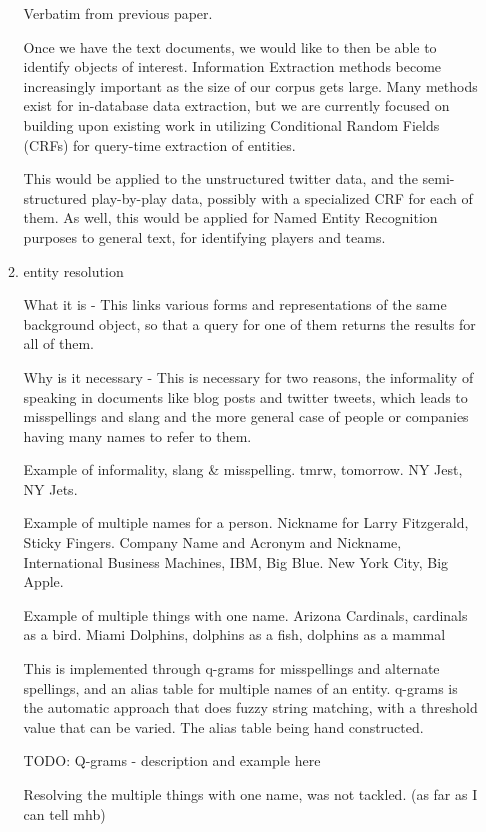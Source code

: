 \documentclass{article}
\begin{document}
\begin{enumerate}
\begin{enumerate}
    Verbatim from previous paper.

    Once we have the text documents, we would like to then be able to identify
    objects of interest. Information Extraction methods become increasingly
    important as the size of our corpus gets large. Many methods exist for in-database data
    extraction, but we are currently focused on building upon existing work in
    utilizing Conditional Random Fields (CRFs) for query-time extraction of
    entities.

    This would be applied to the unstructured twitter data,
    and the semi-structured play-by-play data,
    possibly with a specialized CRF for each of them.
    As well, this would be applied for Named Entity Recognition purposes to general text, for identifying players and teams.

  \item entity resolution

    What it is -
    This links various forms and representations of the same background object,
    so that a query for one of them returns the results for all of them.

    Why is it necessary -
    This is necessary for two reasons,
    the informality of speaking in documents like blog posts and twitter tweets,
    which leads to misspellings and slang
    and the more  general case of people or companies having many names to refer to them.

    Example of informality, slang \& misspelling. tmrw, tomorrow. NY Jest, NY Jets.

    Example of multiple names for a person.
    Nickname for Larry Fitzgerald, Sticky Fingers.
    Company Name and Acronym and Nickname, International Business Machines, IBM, Big Blue.
    New York City, Big Apple.

    Example of multiple things with one name.
    Arizona Cardinals, cardinals as a bird.
    Miami Dolphins, dolphins as a fish, dolphins as a mammal


    This is implemented through q-grams for misspellings and alternate spellings,
    and an alias table for multiple names of an entity.
    q-grams is the automatic approach that does fuzzy string matching,
    with a threshold value that can be varied.
    The alias table being hand constructed.

    TODO: Q-grams - description and example here

    Resolving the multiple things with one name, was not tackled. (as far as I can tell mhb)


\end{enumerate}
\end{enumerate}
\end{document}
